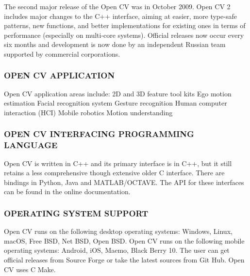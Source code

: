 The second major release of the Open CV was in October 2009. Open CV 2 includes major changes to the C++ interface, aiming at easier, more type-safe patterns, new functions, and better implementations for existing ones in terms of performance (especially on multi-core systems). Official releases now occur every six months and development is now done by an independent Russian team supported by commercial corporations.

\subsubsection{OPEN CV APPLICATION}
Open CV application areas include:
2D and 3D feature tool kits
Ego motion estimation
Facial recognition system
Gesture recognition
Human computer interaction (HCI)
Mobile robotics
Motion understanding

\subsubsection{OPEN CV INTERFACING PROGRAMMING LANGUAGE}
Open CV is written in C++ and its primary interface is in C++, but it still retains a less comprehensive though extensive older C interface. There are bindings in Python, Java and MATLAB/OCTAVE. The API for these interfaces can be found in the online documentation. 

\subsubsection{OPERATING SYSTEM SUPPORT}
Open CV runs on the following desktop operating systems: Windows, Linux, macOS, Free BSD, Net BSD, Open BSD. Open CV runs on the following mobile operating systems: Android, iOS, Maemo, Black Berry 10. The user can get official releases from Source Forge or take the latest sources from Git Hub. Open CV uses C Make.

